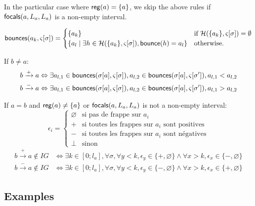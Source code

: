 In the particular case where $\mathsf{reg}({a})=\{a\}$,
we skip the above rules if $\mathsf{focals}(a,L_a,L_a)$ is a non-empty interval.

\[
\mathsf{bounces}(a_k,\varsigma[\sigma]) = 
\begin{cases}
\{ a_k \} & \text{if }\mathcal{H}(\{a_k\},\varsigma[\sigma]) = \emptyset\\
\{ a_l \mid \exists h\in \mathcal{H}(\{a_k\},\varsigma[\sigma]), \mathsf{bounce}(h)=a_l \} 
& \text{otherwise.}
\end{cases}
\]

\noindent
If $b \neq a$:
\begin{align*}
b\xrightarrow + a  & \Leftrightarrow
	\exists a_{l,1}\in\mathsf{bounces}(\sigma[a],\varsigma[\sigma]),
		a_{l,2}\in\mathsf{bounces}(\sigma[a],\varsigma[\sigma']),
			a_{l,1} < a_{l,2} \\
b\xrightarrow - a  & \Leftrightarrow
	\exists a_{l,1}\in\mathsf{bounces}(\sigma[a],\varsigma[\sigma]),
		a_{l,2}\in\mathsf{bounces}(\sigma[a],\varsigma[\sigma']),
			a_{l,1} > a_{l,2}
\end{align*}

\noindent
If $a = b$ and $\mathsf{reg}({a})\neq\{a\}$ or $\mathsf{focals}(a,L_a,L_a)$ is not a non-empty interval:
\[
\epsilon_i =
\begin{cases}
\varnothing & \text{si pas de frappe sur $a_i$} \\
+ &  \text{si toutes les frappes sur $a_i$ sont positives}\\ 
- & \text{si toutes les frappes sur $a_i$ sont négatives}\\
\bot & \text{sinon}
\end{cases}
\]
\begin{align*}
b\xrightarrow + a  \notin IG & \Leftrightarrow
	\exists k \in [0;l_a], \forall \sigma,
		\forall y < k, 
			\epsilon_y \in \{ +, \varnothing \}
		\wedge
		\forall x > k,
			\epsilon_x \in \{ -, \varnothing \} 
\\
b\xrightarrow - a  \notin IG & \Leftrightarrow
	\exists k \in [0;l_a], \forall \sigma,
		\forall y < k, 
			\epsilon_y \in \{ -, \varnothing \}
		\wedge
		\forall x > k,
			\epsilon_x \in \{ +, \varnothing \} 
\end{align*}




\subsection{Examples}

